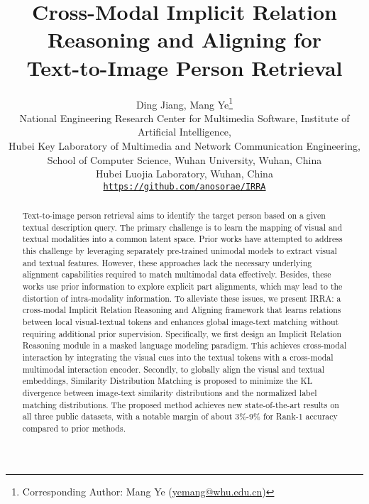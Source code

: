 \documentclass[10pt,twocolumn,letterpaper]{article}
\begin{document}
\title{Cross-Modal Implicit Relation Reasoning and Aligning for \\ Text-to-Image Person Retrieval}

\author{
Ding Jiang, \hspace{2pt} 
Mang Ye\thanks{Corresponding Author: Mang Ye (\href{mailto:yemang@whu.edu.cn}{yemang@whu.edu.cn})} \hspace{2pt}
\\ National Engineering Research Center for Multimedia Software, Institute of Artificial Intelligence,
\\ Hubei Key Laboratory of Multimedia and Network Communication Engineering, 
\\School of Computer Science, Wuhan University, Wuhan, China\\
 Hubei Luojia Laboratory, Wuhan, China\\
{\tt\small \href{https://github.com/anosorae/IRRA}{https://github.com/anosorae/IRRA}}
}

\maketitle

\begin{abstract}
  Text-to-image person retrieval aims to identify the target person based on a given textual description query.
  The primary challenge is to learn the mapping of visual and textual modalities into a common latent space. 
  Prior works have attempted to address this challenge by leveraging separately pre-trained unimodal models to extract visual and textual features. However, these approaches lack the necessary underlying alignment capabilities required to match multimodal data effectively. Besides, these works use prior information to explore explicit part alignments, which may lead to the distortion of intra-modality information. 
  To alleviate these issues, we present IRRA: a cross-modal Implicit Relation Reasoning and Aligning framework that learns relations between local visual-textual tokens and enhances global image-text matching without requiring additional prior supervision. 
  Specifically, we first design an Implicit Relation Reasoning module in a masked language modeling paradigm. This achieves cross-modal interaction by integrating the visual cues into the textual tokens with a cross-modal multimodal interaction encoder.
  Secondly, to globally align the visual and textual embeddings, Similarity Distribution Matching is proposed to minimize the KL divergence between image-text similarity distributions and the normalized label matching distributions. The proposed method achieves new state-of-the-art results on all three public datasets, with a notable margin of about 3\%-9\% for Rank-1 accuracy compared to prior methods.
\end{abstract}
\end{document}
